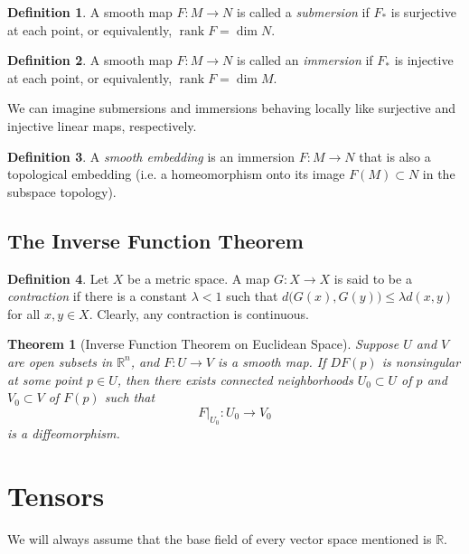 \documentclass{article}
\DeclareMathOperator{\rank}{rank}
\newtheorem{theorem}{Theorem}[section]
\theoremstyle{remark}
\theoremstyle{definition}
\newtheorem{definition}{Definition}[section]
\begin{document}
    \begin{definition}
    A smooth map $F: M \longrightarrow N$ is called a \textit{submersion} if $F_*$ is surjective at each point, or equivalently, $\rank{F} = \dim{N}$. 
    \end{definition}

    \begin{definition}
    A smooth map $F: M \longrightarrow N$ is called an \textit{immersion} if $F_*$ is injective at each point, or equivalently, $\rank{F} = \dim{M}$. 
    \end{definition}

    We can imagine submersions and immersions behaving locally like surjective and injective linear maps, respectively. 

    \begin{definition}
    A \textit{smooth embedding} is an immersion $F: M \longrightarrow N$ that is also a topological embedding (i.e. a homeomorphism onto its image $F(M) \subset N$ in the subspace topology). 
    \end{definition}

  \subsection{The Inverse Function Theorem}

    \begin{definition}
    Let $X$ be a metric space. A map $G: X \longrightarrow X$ is said to be a \textit{contraction} if there is a constant $\lambda < 1$ such that $d\big( G(x), G(y) \big) \leq \lambda d(x, y)$ for all $x, y \in X$. Clearly, any contraction is continuous. 
    \end{definition}

    \begin{theorem}[Inverse Function Theorem on Euclidean Space]
    Suppose $U$ and $V$ are open subsets in $\mathbb{R}^n$, and $F: U \longrightarrow V$ is a smooth map. If $DF(p)$ is nonsingular at some point $p \in U$, then there exists connected neighborhoods $U_0 \subset U$ of $p$ and $V_0 \subset V$ of $F(p)$ such that 
    \[F \big|_{U_0} : U_0 \longrightarrow V_0\]
    is a diffeomorphism. 
    \end{theorem}

\section{Tensors}

  We will always assume that the base field of every vector space mentioned is $\mathbb{R}$. 
\end{document}
